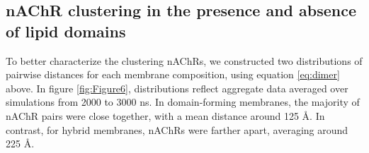 









\subsection{nAChR clustering in the presence and absence of lipid domains} \label{sec:clustering}
To better characterize the clustering nAChRs, we constructed two distributions of pairwise distances for each membrane composition, using equation \ref{eq:dimer} above. In figure \ref{fig:Figure6}, distributions reflect aggregate data averaged over simulations from 2000 to 3000 ns. In domain-forming membranes, the majority of nAChR pairs were close together, with a mean distance around 125 {\AA}. In contrast, for hybrid membranes, nAChRs were farther apart, averaging around 225 {\AA}.  


